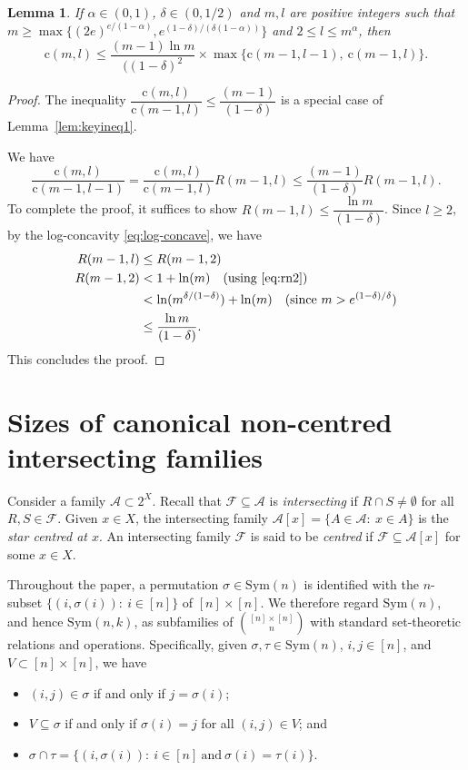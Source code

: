 \documentclass{amsart}
\newtheorem{lem}[thm]{Lemma}
\newcommand{\mcal}{\mathcal}
\newcommand{\sym}{\mathrm{Sym}}
\newcommand{\st}{\mathrm{c}}
\begin{document}
\begin{lem}\label{lem:keyineq2}
If $\alpha \in(0, 1)$, $\delta \in (0,1/2)$ and $m,l$ are positive integers such that $m\geq \max\{(2e)^{e/(1-\alpha)}, e^{(1-\delta)/(\delta(1-\alpha))}\}$ and $2\leq l\leq m^{\alpha}$, then 
\[\st(m,l) \leq \dfrac{(m-1)\ln m}{((1-\delta)^{2}} \times \max\{\st(m-1,l-1),\ \st(m-1,l)\}.
\]
\end{lem}
\begin{proof}
The inequality $\dfrac{\st(m,l)}{\st(m-1,l)} \leq \dfrac{(m-1)}{(1-\delta)}$ is a special case of Lemma~\ref{lem:keyineq1}. 

We have 
\[\dfrac{\st(m,l)}{\st(m-1,l-1)}= \dfrac{\st(m,l)}{\st(m-1,l)} R(m-1,l) \leq \dfrac{(m-1)}{(1-\delta)} R(m-1,l).\]
To complete the proof, it suffices to show $R(m-1,l) \leq \dfrac{\ln m}{(1-\delta)}$. 
Since $l\geq 2$, by the log-concavity \eqref{eq:log-concave}, we have 
\begin{align*}
R(m-1,l)&\leq R(m-1,2)\\
R(m-1,2) &< 1+\ln(m) \quad (\text{using \eqref{eq:rn2}}) \\
&< \ln(m^{\delta/(1-\delta)})+\ln(m)\quad (\text{since $m>e^{(1-\delta)/\delta}$})\\
&\leq \dfrac{\ln m}{(1-\delta)}.
\end{align*}
This concludes the proof.
\end{proof}  

\section{Sizes of canonical non-centred intersecting families}\label{sec:der}
Consider a family $\mcal{A}\subset 2^{X}$. Recall that $\mcal{F}\subseteq \mcal{A}$ is {\it intersecting} if $R\cap S \neq \emptyset$ for all $R,S\in \mcal{F}$. Given $x \in X$, the intersecting family $\mcal{A}[x]=\{A \in \mcal{A}\colon\ x \in A\}$ is the {\it star centred at $x$}. 
An  intersecting family $\mcal{F}$ is said to be {\it centred} if $\mcal{F}\subseteq \mcal{A}[x]$ for some $x \in X$.

Throughout the paper, a permutation $\sigma\in \sym(n)$ is identified with the $n$-subset $\{(i,\sigma(i))\colon \ i \in [n] \}$ of $[n]\times [n]$. We therefore regard $\sym(n)$, and hence $\sym(n,k)$, as subfamilies of $\binom{[n]\times [n]}{n}$ with standard set-theoretic relations and operations. Specifically, given $\sigma,\tau\in\sym(n)$, $i,j \in [n]$, and $V\subset [n]\times [n]$, we have
\begin{itemize} 
 \item $(i,j) \in \sigma$ if and only if $j=\sigma(i)$;
 \item $V\subseteq \sigma$ if and only if $\sigma(i)=j$ for all $(i,j) \in V$; and
 \item $\sigma \cap \tau =\{(i,\sigma(i))\colon\ i\in[n] \ \text{and}\ \sigma(i)=\tau(i)\}$.
\end{itemize}
\end{document}
